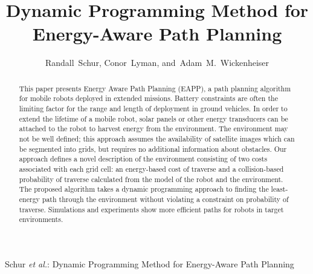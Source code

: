 \documentclass[journal]{IEEEtran}
\begin{document}
\title{Dynamic Programming Method for Energy-Aware Path Planning}

%

\author{Randall~Schur, Conor~Lyman,
        and~Adam~M.~Wickenheiser
}


%
{Schur \MakeLowercase{\textit{et al.}}: Dynamic Programming Method for Energy-Aware Path Planning}

\maketitle

\begin{abstract}
This paper presents Energy Aware Path Planning (EAPP), a path planning algorithm for mobile robots deployed in extended missions. Battery constraints are often the limiting factor for the range and length of deployment in ground vehicles. In order to extend the lifetime of a mobile robot, solar panels or other energy transducers can be attached to the robot to harvest energy from the environment. The environment may not be well defined; this approach assumes the availability of satellite images which can be segmented into grids, but requires no additional information about obstacles. Our approach defines a novel description of the environment consisting of two costs associated with each grid cell: an energy-based cost of traverse and a collision-based probability of traverse calculated from the model of the robot and the environment. The proposed algorithm takes a dynamic programming approach to finding the least-energy path through the environment without violating a constraint on probability of traverse. Simulations and experiments show more efficient paths for robots in target environments.
\end{abstract}
\end{document}
